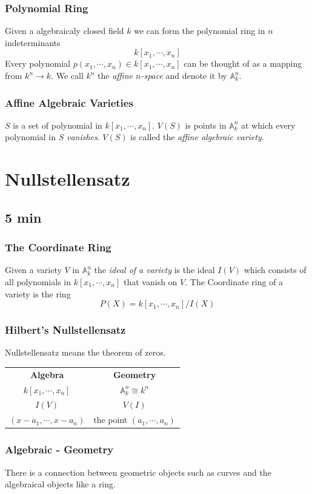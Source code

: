 \documentclass[pdf]{beamer}
\begin{document}
\begin{frame}
    \frametitle{Polynomial Ring}
    Given a algebraicaly closed field $k$ we can form the polynomial ring in $n$ indeterminants
    $$k[x_1, \cdots, x_n]$$
    Every polynomial $p(x_1, \cdots, x_n) \in k[x_1, \cdots, x_n]$ can be thought of as a mapping from $k^n \rightarrow k$.
    We call $k^n$ the \textit{affine $n$-space} and denote it by $\mathbb{A}^n_k$.
\end{frame}

\begin{frame}
    \frametitle{Affine Algebraic Varieties}
    $S$ is a set of polynomial in $k[x_1, \cdots, x_n]$. $V(S)$ is points in $\mathbb{A}^n_k$ at which every polynomial in $S$ \textit{vanishes}. $V(S)$ is called the \textit{affine algebraic variety}.
\end{frame}    

\section{Nullstellensatz}
\subsection{5 min}

\begin{frame}
    \frametitle{The Coordinate Ring}
    Given a variety $V$ in $\mathbb{A}^n_k$ the \textit{ideal of a variety} is the ideal $I(V)$ which consists of all polynomials in $k[x_1, \cdots, x_n]$ that vanish on $V$. The Coordinate ring of a variety is the ring
    $$P(X) = k[x_1, \cdots, x_n]/I(X)$$
\end{frame}

\begin{frame}
    \frametitle{Hilbert's Nullstellensatz}
    \center Nullstellensatz means the theorem of zeros.
    \begin{center}
    \begin{tabular}{c | c}
        \large{\textbf{Algebra}} & \large{\textbf{Geometry}} \\
        $k[x_1, \cdots, x_n]$ & $\mathbb{A}^n_k \cong k^n$ \\
        $I(V)$ & $V(I)$ \\
        $(x - a_1, \cdots, x - a_n)$ & the point $(a_1, \cdots, a_n)$
    \end{tabular}
\end{center}
\end{frame}

\begin{frame}
    \frametitle{Algebraic - Geometry}
    There is a connection between geometric objects such as curves and the algebraical objects like a ring. 
\end{frame}
\end{document}
